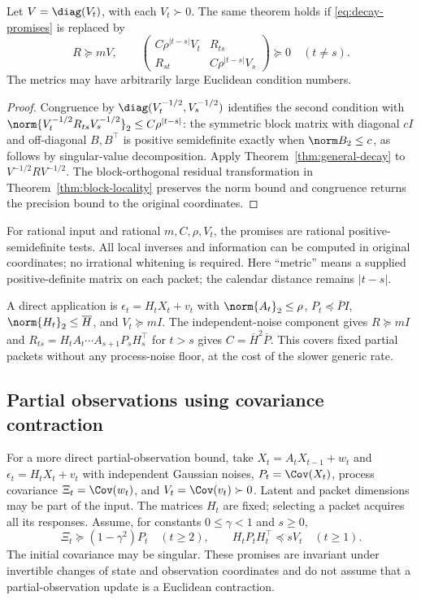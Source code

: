 \begin{corollary}
\label{cor:decay-metric}
Let $V=\diag(V_t)$, with each $V_t\succ0$. The same theorem holds if
\eqref{eq:decay-promises} is replaced by
\begin{equation}
 R\succeq mV,\qquad
 \begin{pmatrix}
 C\rho^{|t-s|}V_t&R_{ts}\\R_{st}&C\rho^{|t-s|}V_s
 \end{pmatrix}\succeq0\quad(t\ne s).
 \label{eq:metric-decay-promises}
\end{equation}
The metrics may have arbitrarily large Euclidean condition numbers.
\end{corollary}
\begin{proof}
Congruence by $\diag(V_t^{-1/2},V_s^{-1/2})$ identifies the second
condition with
$\norm{V_t^{-1/2}R_{ts}V_s^{-1/2}}_2\le C\rho^{|t-s|}$:
the symmetric block matrix with diagonal $cI$ and off-diagonal $B,B^\top$
is positive semidefinite exactly when $\norm B_2\le c$, as follows by
singular-value decomposition. Apply Theorem~\ref{thm:general-decay}
to $V^{-1/2}RV^{-1/2}$. The block-orthogonal residual transformation in
Theorem~\ref{thm:block-locality} preserves the norm bound and congruence
returns the precision bound to the original coordinates.
\end{proof}
For rational input and rational $m,C,\rho,V_t$, the promises are rational
positive-semidefinite tests. All local inverses and information can be
computed in original coordinates; no irrational whitening is required.
Here ``metric'' means a supplied positive-definite matrix on each packet;
the calendar distance remains $|t-s|$.

A direct application is $\epsilon_t=H_tX_t+v_t$ with
$\norm{A_t}_2\le\rho$, $P_t\preceq\overline P I$,
$\norm{H_t}_2\le\overline H$, and $V_t\succeq mI$.
The independent-noise component gives $R\succeq mI$ and
$R_{ts}=H_tA_t\cdots A_{s+1}P_sH_s^\top$ for $t>s$ gives
$C=\overline H^2\overline P$. This covers fixed partial packets without
any process-noise floor, at the cost of the slower generic rate.

\subsection{Partial observations using covariance contraction}
\label{subsec:partial-locality}
For a more direct partial-observation bound, take
$X_t=A_tX_{t-1}+w_t$ and $\epsilon_t=H_tX_t+v_t$ with independent
Gaussian noises, $P_t=\Cov(X_t)$, process covariance $\Xi_t=\Cov(w_t)$,
and $V_t=\Cov(v_t)\succ0$. Latent and packet dimensions may be part of
the input. The matrices $H_t$ are fixed; selecting a packet acquires all
its responses. Assume, for constants $0\le\gamma<1$ and $s\ge0$,
\begin{equation}
 \Xi_t\succeq(1-\gamma^2)P_t\quad(t\ge2),\qquad
 H_tP_tH_t^\top\preceq sV_t\quad(t\ge1).
 \label{eq:intrinsic-partial-promises}
\end{equation}
The initial covariance may be singular. These promises are invariant under
invertible changes of state and observation coordinates and do not assume
that a partial-observation update is a Euclidean contraction.

